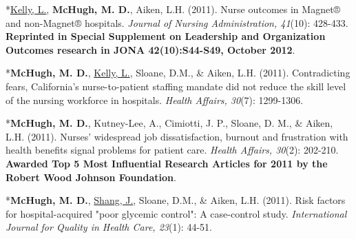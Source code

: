 \documentclass[10pt,]{article}
\begin{document}
{{{{{{{{{{{{{{{\begin{hangparas}{.25in}{1}
\end{hangparas}



\begin{hangparas}{.25in}{1}

*{\underline {Kelly, L.}}, {\textbf {McHugh, M. D.}}, Aiken, L.H. (2011). Nurse outcomes in Magnet® and non-Magnet® hospitals. {\textit {Journal of Nursing Administration, 41}}(10): 428-433. {\textbf {Reprinted in Special Supplement on Leadership and Organization Outcomes research in JONA 42(10):S44-S49, October 2012}}.

\end{hangparas}



\begin{hangparas}{.25in}{1}

*{\textbf {McHugh, M. D.}}, {\underline {Kelly, L.}}, Sloane, D.M., \& Aiken, L.H. (2011). Contradicting fears, California’s nurse-to-patient staffing mandate did not reduce the skill level of the nursing workforce in hospitals. {\textit {Health Affairs, 30}}(7): 1299-1306.

\end{hangparas}

\vspace{2mm}

\begin{hangparas}{.25in}{1}

*{\textbf {McHugh, M. D.}}, Kutney-Lee, A., Cimiotti, J. P., Sloane, D. M., \& Aiken, L.H. (2011). Nurses’ widespread job dissatisfaction, burnout and frustration with health benefits signal problems for patient care. {\textit {Health Affairs, 30}}(2): 202-210. {\textbf {Awarded Top 5 Most Influential Research Articles for 2011 by the Robert Wood Johnson Foundation}}.

\end{hangparas}



\begin{hangparas}{.25in}{1}

*{\textbf {McHugh, M. D.}}, {\underline {Shang, J.}}, Sloane, D.M., \& Aiken, L.H. (2011). Risk factors for hospital-acquired "poor glycemic control": A case-control study. {\textit {International Journal for Quality in Health Care, 23}}(1): 44-51.

\end{hangparas}



\begin{hangparas}{.25in}{1}


\end{hangparas}}}}}}}}}}}}}}}}
\end{document}
